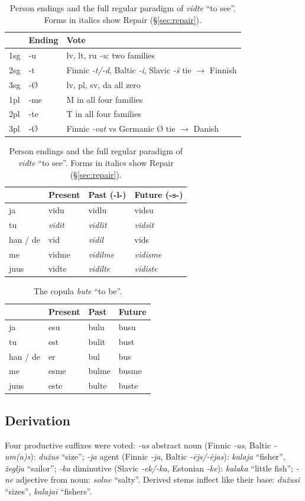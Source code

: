 \begin{table}[t]
\centering\small
\caption{Person endings and the full regular paradigm of \emph{vidte} ``to see''. Forms in italics show Repair (\S\ref{sec:repair}).}
\label{tab:verbs}
\begin{tabular}{@{}llp{2.6cm}@{}}
\toprule
& Ending & Vote \\
\midrule
1sg & -u & lv, lt, ru \emph{-u}: two families \\
2sg & -t & Finnic \emph{-t/-d}, Baltic \emph{-i}, Slavic \emph{-š} tie $\rightarrow$ Finnish \\
3sg & -Ø & lv, pl, sv, da all zero \\
1pl & -me & M in all four families \\
2pl & -te & T in all four families \\
3pl & -Ø & Finnic \emph{-vat} vs Germanic Ø tie $\rightarrow$ Danish \\
\bottomrule
\end{tabular}

\medskip
\begin{tabular}{@{}llll@{}}
\toprule
& Present & Past (-l-) & Future (-s-) \\
\midrule
ja & vidu & vidlu & vidsu \\
tu & \emph{vidit} & \emph{vidlit} & \emph{vidsit} \\
han / de & vid & \emph{vidil} & vids \\
me & vidme & \emph{vidilme} & \emph{vidisme} \\
juus & vidte & \emph{vidilte} & \emph{vidiste} \\
\bottomrule
\end{tabular}
\end{table}

\begin{table}[t]
\centering\small
\caption{The copula \emph{bute} ``to be''.}
\label{tab:copula}
\begin{tabular}{@{}llll@{}}
\toprule
& Present & Past & Future \\
\midrule
ja & esu & bulu & busu \\
tu & est & bulit & bust \\
han / de & er & bul & bus \\
me & esme & bulme & busme \\
juus & este & bulte & buste \\
\bottomrule
\end{tabular}
\end{table}

\subsection{Derivation}
Four productive suffixes were voted: \emph{-us} abstract noun (Finnic \emph{-us}, Baltic \emph{-um(a)s}): \emph{dužus} ``size''; \emph{-ja} agent (Finnic \emph{-ja}, Baltic \emph{-ējs/-ėjas}): \emph{kalaja} ``fisher'', \emph{žeglja} ``sailor''; \emph{-ka} diminutive (Slavic \emph{-ek/-ka}, Estonian \emph{-ke}): \emph{kalaka} ``little fish''; \emph{-ne} adjective from noun: \emph{solne} ``salty''. Derived stems inflect like their base: \emph{dužusi} ``sizes'', \emph{kalajai} ``fishers''.
